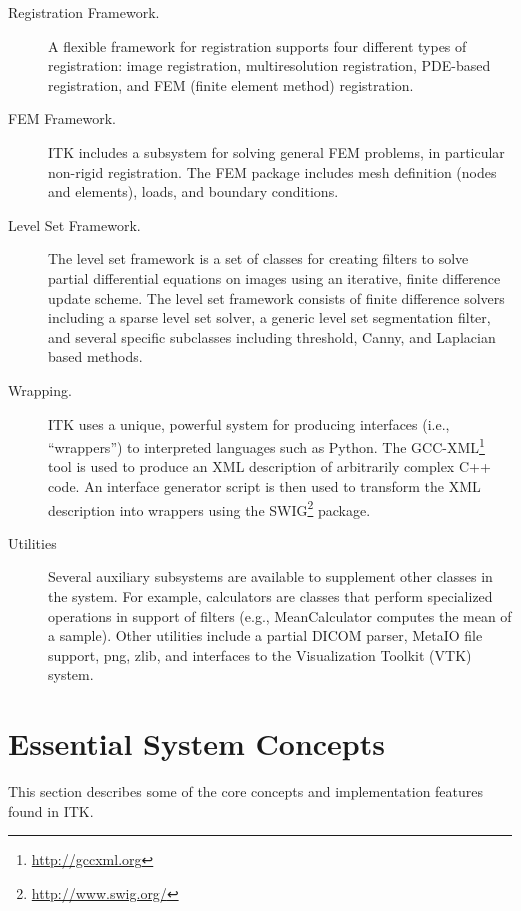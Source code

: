 \begin{description}
	\item[Registration Framework.] A flexible framework for registration
        supports four different types of registration: image registration,
        multiresolution registration, PDE-based registration, and FEM (finite
        element method) registration.

	\item[FEM Framework.] ITK includes a subsystem for solving general
        FEM problems, in particular non-rigid registration. The FEM package
        includes mesh definition (nodes and elements), loads, and boundary
        conditions.

	\item[Level Set Framework.] The level set framework is a set of
        classes for creating filters to solve partial differential equations
        on images using an iterative, finite difference update scheme. The
        level set framework consists of finite difference solvers including a
        sparse level set solver, a generic level set segmentation filter, and
        several specific subclasses including threshold, Canny, and Laplacian
        based methods.

	\item[Wrapping.] ITK uses a unique, powerful system for
	producing interfaces (i.e., ``wrappers'') to interpreted
	languages such as Python. The GCC-XML\footnote{\url{http://gccxml.org}}
        tool is used to produce an XML description of arbitrarily complex C++ code.
	An interface generator script is then used to transform the XML description
        into wrappers using the SWIG\footnote{\url{http://www.swig.org/}} package.

        \item[Utilities] Several auxiliary subsystems are available to
        supplement other classes in the system. For example, calculators are
        classes that perform specialized operations in support of filters
        (e.g., MeanCalculator computes the mean of a sample). Other utilities
        include a partial DICOM parser, MetaIO file support, png, zlib, and
        interfaces to the Visualization Toolkit (VTK) system.
\end{description}


\section{Essential System Concepts}
\label{sec:EssentialSystemConcepts}

This section describes some of the core concepts and implementation features
found in ITK.

